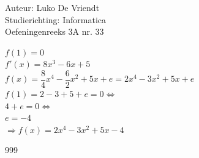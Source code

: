 \documentclass[a4paper]{article}
\begin{document}
\noindent \large Auteur: Luko De Vriendt\\
\noindent \large Studierichting: Informatica\\
\noindent \large Oefeningenreeks 3A nr. 33\\

\medskip

\normalsize

$f(1) = 0$ \\

$f'(x) = 8x^3 - 6x + 5$ \\

$f(x) = \dfrac{8}{4}x^4 - \dfrac{6}{2}x^2 + 5x + e = 2x^4 - 3x^2 + 5x + e$ \\

$f(1) = 2 - 3 + 5 + e = 0 \Leftrightarrow $\\

$4 + e = 0 \Leftrightarrow $ \\

$e = -4$ \\

$ \Rightarrow f(x) = 2x^4 - 3x^2 + 5x - 4$ \\

\begin{thebibliography}{999}
\end{thebibliography}
\end{document}
